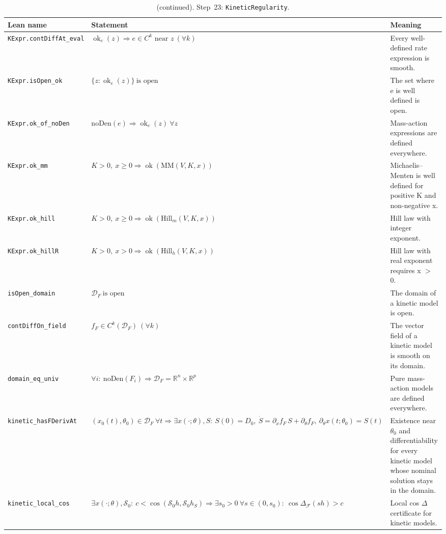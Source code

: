 \addtocounter{table}{-1}
{\small
\begin{longtable}{@{}>{\raggedright\arraybackslash}p{3.6cm}>{\raggedright\arraybackslash}p{6.6cm}>{\raggedright\arraybackslash}p{5.6cm}@{}}
\caption[]{(continued). Step~23: \texttt{KineticRegularity}.}\\
\toprule
Lean name & Statement & Meaning \\
\midrule
\endhead
\texttt{KExpr.\allowbreak{}contDiffAt\_\allowbreak{}eval} & $\displaystyle \operatorname{ok}_e(z)\Rightarrow e\in C^k\text{ near }z\ (\forall k)$ & Every well-defined rate expression is smooth. \\[3pt]
\texttt{KExpr.\allowbreak{}isOpen\_\allowbreak{}ok} & $\displaystyle \{z:\operatorname{ok}_e(z)\}\ \text{is open}$ & The set where e is well defined is open. \\[3pt]
\texttt{KExpr.\allowbreak{}ok\_\allowbreak{}of\_\allowbreak{}noDen} & $\displaystyle \mathrm{noDen}(e)\Rightarrow\operatorname{ok}_e(z)\ \forall z$ & Mass-action expressions are defined everywhere. \\[3pt]
\texttt{KExpr.\allowbreak{}ok\_\allowbreak{}mm} & $\displaystyle K>0,\ x\ge0\Rightarrow\operatorname{ok}(\mathrm{MM}(V,K,x))$ & Michaelis--Menten is well defined for positive K and non-negative x. \\[3pt]
\texttt{KExpr.\allowbreak{}ok\_\allowbreak{}hill} & $\displaystyle K>0,\ x\ge0\Rightarrow\operatorname{ok}(\mathrm{Hill}_m(V,K,x))$ & Hill law with integer exponent. \\[3pt]
\texttt{KExpr.\allowbreak{}ok\_\allowbreak{}hillR} & $\displaystyle K>0,\ x>0\Rightarrow\operatorname{ok}(\mathrm{Hill}_h(V,K,x))$ & Hill law with real exponent requires x $>$ 0. \\[3pt]
\texttt{isOpen\_\allowbreak{}domain} & $\displaystyle \mathcal D_F\ \text{is open}$ & The domain of a kinetic model is open. \\[3pt]
\texttt{contDiffOn\_\allowbreak{}field} & $\displaystyle f_F\in C^k(\mathcal D_F)\ (\forall k)$ & The vector field of a kinetic model is smooth on its domain. \\[3pt]
\texttt{domain\_\allowbreak{}eq\_\allowbreak{}univ} & $\displaystyle \forall i:\ \mathrm{noDen}(F_i)\Rightarrow\mathcal D_F=\mathbb{R}^n\times\mathbb{R}^p$ & Pure mass-action models are defined everywhere. \\[3pt]
\texttt{kinetic\_\allowbreak{}hasFDerivAt} & $\displaystyle (x_0(t),\theta_0)\in\mathcal D_F\ \forall t\Rightarrow\exists x(\cdot;\theta),S:\ S(0)=D_0,\ \dot S=\partial_xf_F\,S+\partial_\theta f_F,\ \partial_\theta x(t;\theta_0)=S(t)$ & Existence near $\theta_0$ and differentiability for every kinetic model whose nominal solution stays in the domain. \\[3pt]
\texttt{kinetic\_\allowbreak{}local\_\allowbreak{}cos} & $\displaystyle \exists x(\cdot;\theta),\mathcal S_0:\ c<\cos(\mathcal S_0h,\mathcal S_0h_S)\Rightarrow\exists s_0>0\ \forall s\in(0,s_0):\ \cos\Delta_{\mathcal F}(sh)>c$ & Local cos $\Delta$ certificate for kinetic models. \\[3pt]
\bottomrule
\end{longtable}
}

